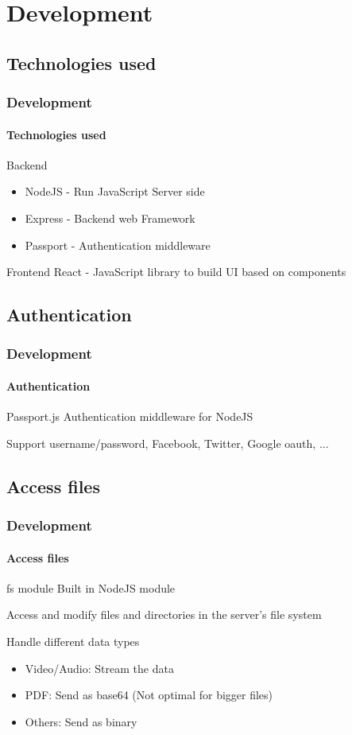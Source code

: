\documentclass{beamer}
\begin{document}
	\section{Development}
	\subsection{Technologies used}
	\begin{frame}
		\frametitle{Development}
		\framesubtitle{Technologies used}
		\begin{alertblock}{Backend}
			\begin{itemize}
				\item NodeJS - Run JavaScript Server side
				\item Express - Backend web Framework
				\item Passport - Authentication middleware
			\end{itemize}
		\end{alertblock}
		
		\begin{alertblock}{Frontend}
			React - JavaScript library to build UI based on components
		\end{alertblock}
	\end{frame}
	
	\subsection{Authentication}
	\begin{frame}
		\frametitle{Development}
		\framesubtitle{Authentication}
		\begin{alertblock}{Passport.js}
			Authentication middleware for NodeJS\linebreak
			
			Support username/password, Facebook, Twitter, Google oauth, ...
		\end{alertblock}
	\end{frame}
	
	\subsection{Access files}
	\begin{frame}
		\frametitle{Development}
		\framesubtitle{Access files}
		\begin{alertblock}{fs module}
			Built in NodeJS module\linebreak
			
			Access and modify files and directories in the server's file system
		\end{alertblock}
		
		\begin{alertblock}{Handle different data types}
			\begin{itemize}
				\item Video/Audio: Stream the data
				\item PDF: Send as base64 (Not optimal for bigger files)
				\item Others: Send as binary
			\end{itemize}
		\end{alertblock}
	\end{frame}
	
\end{document}
